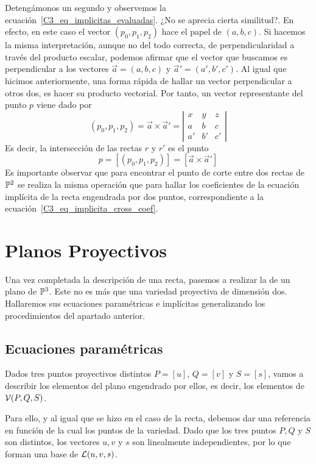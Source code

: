 Detengámonos un segundo y observemos la ecuación~\eqref{C3_eq_implicitas_evaluadas}. ¿No se aprecia cierta similitud?. En efecto, en este caso el vector $(p_0,p_1,p_2)$ hace el papel de $(a,b,c)$. Si hacemos la misma interpretación, aunque no del todo correcta, de perpendicularidad a través del producto escalar, podemos afirmar que el vector que buscamos es perpendicular a los vectores $\vec{a}=(a,b,c)$ y $\vec{a}'=(a',b',c')$. Al igual que hicimos anteriormente, una forma rápida de hallar un vector perpendicular a otros dos, es hacer su producto vectorial. Por tanto, un vector representante del punto $p$ viene dado por
\begin{equation*}
	(p_0,p_1,p_2)=\vec{a}\times \vec{a}'=\left| \begin{array}{ccc}
		x & y & z\\
		a & b & c\\
		a' & b' & c'
	\end{array}\right| 
\end{equation*}
Es decir, la intersección de las rectas $r$ y $r'$ es el punto 
\begin{equation}
	p=[(p_0,p_1,p_2)]=[\vec{a}\times \vec{a}']
\end{equation}
Es importante observar que para encontrar el punto de corte entre dos rectas de $\mathbb{P}^2$ se realiza la misma operación que para hallar los coeficientes de la ecuación implícita de la recta engendrada por dos puntos, correspondiente a la ecuación~\eqref{C3_eq_implicita_cross_coef}. 

\section{Planos Proyectivos}\label{C3_sec_planos}

Una vez completada la descripción de una recta, pasemos a realizar la de un plano de $\mathbb{P}^3$. Este no es más que una variedad proyectiva de dimensión dos. Hallaremos sus ecuaciones paramétricas e implícitas generalizando los procedimientos del apartado anterior.

\subsection{Ecuaciones paramétricas}

Dados tres puntos proyectivos distintos $P=[u]$, $Q=[v]$ y $S=[s]$, vamos a describir los elementos del plano engendrado por ellos, es decir, los elementos de $\mathcal{V}(P,Q,S)$. 

Para ello, y al igual que se hizo en el caso de la recta, debemos dar una referencia en función de la cual  los puntos de la variedad. Dado que los tres puntos $P,Q$ y $S$ son distintos, los vectores $u,v$ y $s$ son linealmente independientes, por lo que forman una base de $\mathcal{L}(u,v,s)$.

